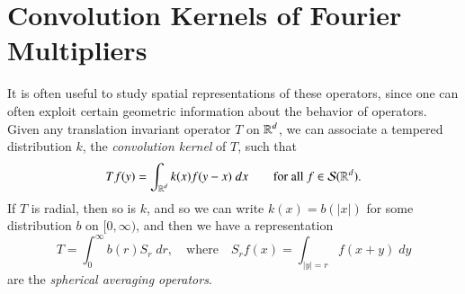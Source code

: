 %
%
%
%
%
%

\section{Convolution Kernels of Fourier Multipliers}

It is often useful to study spatial representations of these operators, since one can often exploit certain geometric information about the behavior of operators. Given any translation invariant operator $T$ on $\operatorname{\mathbb{R}}^d$, we can associate a tempered distribution $k$, the \emph{convolution kernel} of $T$, such that
%
\begin{equation}
  Tf(y) = \int_{\operatorname{\mathbb{R}}^d} k(x) f(y-x)\; dx \quad\quad\text{for all $f \in \mathcal{S}(\operatorname{\mathbb{R}}^d)$}.
\end{equation}
%
If $T$ is radial, then so is $k$, and so we can write $k(x) = b(|x|)$ for some distribution $b$ on $[0,\infty)$, and then we have a representation
%
\begin{equation}
  T = \int_0^\infty b(r) S_r\; dr,\quad\text{where}\quad S_rf(x) = \int_{|y| = r} f(x + y)\; dy 
\end{equation}
%
are the \emph{spherical averaging operators}.

